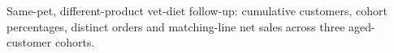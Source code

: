 Same-pet, different-product vet-diet follow-up: cumulative customers, cohort percentages, distinct orders and matching-line net sales across three aged-customer cohorts.
